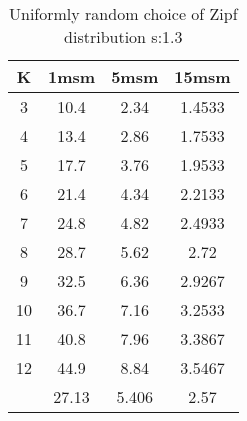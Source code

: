 \begin{table}[H]
\centering
\begin{tabular}{c|ccc}
K &1msm &5msm &15msm\\
\hline
3 & 10.4 & 2.34 & 1.4533\\
4 & 13.4 & 2.86 & 1.7533\\
5 & 17.7 & 3.76 & 1.9533\\
6 & 21.4 & 4.34 & 2.2133\\
7 & 24.8 & 4.82 & 2.4933\\
8 & 28.7 & 5.62 & 2.72\\
9 & 32.5 & 6.36 & 2.9267\\
10 & 36.7 & 7.16 & 3.2533\\
11 & 40.8 & 7.96 & 3.3867\\
12 & 44.9 & 8.84 & 3.5467\\
\hline
& 27.13 & 5.406 & 2.57\\
\end{tabular}
\caption{Uniformly random choice of Zipf distribution s:1.3}
\label{tab:s1.3}
\end{table}
